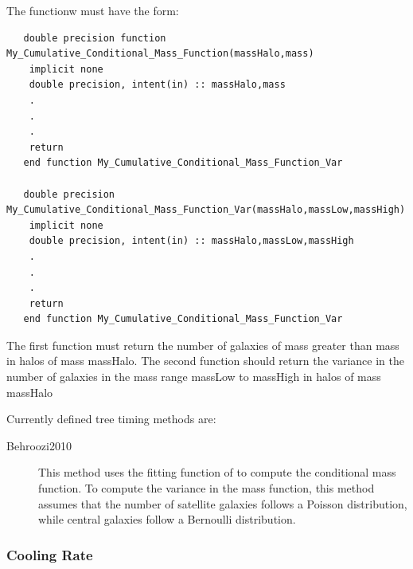 The functionw must have the form:
\begin{verbatim}
   double precision function My_Cumulative_Conditional_Mass_Function(massHalo,mass)
    implicit none
    double precision, intent(in) :: massHalo,mass
    .
    .
    .
    return
   end function My_Cumulative_Conditional_Mass_Function_Var

   double precision My_Cumulative_Conditional_Mass_Function_Var(massHalo,massLow,massHigh)
    implicit none
    double precision, intent(in) :: massHalo,massLow,massHigh
    .
    .
    .
    return
   end function My_Cumulative_Conditional_Mass_Function_Var 
\end{verbatim}
The first function must return the number of galaxies of mass greater than {\normalfont \ttfamily mass} in halos of mass {\normalfont \ttfamily massHalo}. The second function should return the variance in the number of galaxies in the mass range {\normalfont \ttfamily massLow} to {\normalfont \ttfamily massHigh} in halos of mass {\normalfont \ttfamily massHalo}

Currently defined tree timing methods are:
\begin{description}
 \item [{\normalfont \ttfamily Behroozi2010}] This method uses the fitting function of \cite{behroozi_comprehensive_2010} to compute the conditional mass function. To compute the variance in the mass function, this method assumes that the number of satellite galaxies follows a Poisson distribution, while central galaxies follow a \gls{Bernoulli distribution}.
\end{description}

\subsubsection{Cooling Rate}


